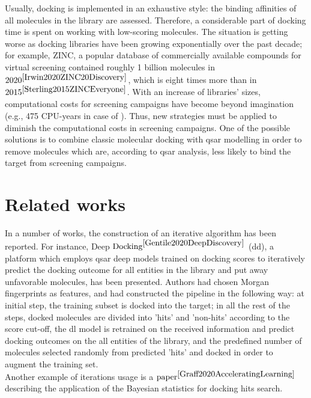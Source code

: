 Usually, docking is implemented in an exhaustive style: the binding affinities of all molecules in the library are assessed.
Therefore, a considerable part of docking time is spent on working with low-scoring molecules.
The situation is getting worse as docking libraries have been growing exponentially over the past decade; for example, ZINC, a popular database of commercially available compounds for virtual screening contained roughly 1 billion molecules in $2020^{\cite{Irwin2020ZINC20Discovery}}$, which is eight times more than in $2015^{\cite{Sterling2015ZINCEveryone}}$.
With an increase of libraries' sizes, computational costs for screening campaigns have become beyond imagination (e.g.,  475 CPU-years in case of \cite{Gorgulla2020AnScreens}).
Thus, new strategies must be applied to diminish the computational costs in screening campaigns.
One of the possible solutions is to combine classic molecular docking with \acrshort{qsar} modelling in order to remove molecules which are, according to \acrshort{qsar} analysis, less likely to bind the target from screening campaigns.\\

\section{Related works}
 
In a number of works, the construction of an iterative algorithm has been reported.
For instance, Deep $\text{Docking}^{\cite{Gentile2020DeepDiscovery}}$ (\acrshort{dd}), a platform which employs \acrshort{qsar} deep models trained on docking scores to iteratively predict the docking outcome for all entities in the library and put away unfavorable molecules, has been presented.
Authors had chosen Morgan fingerprints as features, and had constructed the pipeline in the following way: at initial step, the training subset is docked into the target; in all the rest of the steps, docked molecules are divided into 'hits' and 'non-hits' according to the score cut-off, the \acrshort{dl} model is retrained on the received information and predict docking outcomes on the all entities of the library, and the predefined number of molecules selected randomly from predicted 'hits' and docked in order to augment the training set.\\

Another example of iterations usage is a $\text{paper}^{\cite{Graff2020AcceleratingLearning}}$ describing the application of the Bayesian statistics for docking hits search. \\

